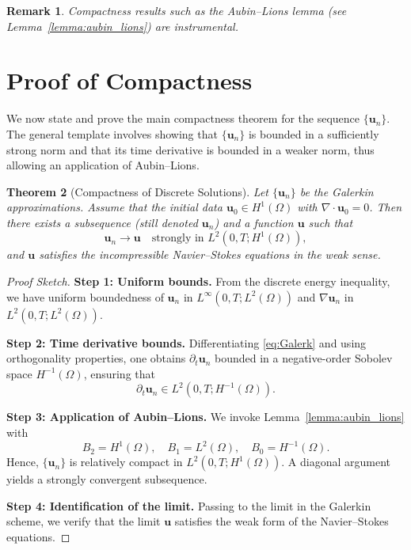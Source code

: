 \documentclass[11pt]{article}
\newtheorem{theorem}{Theorem}[section]
\newtheorem{remark}[theorem]{Remark}
\numberwithin{equation}{section}
\begin{document}
\begin{remark}
Compactness results such as the Aubin--Lions lemma
(see Lemma~\ref{lemma:aubin_lions}) are instrumental.
\end{remark}

\section{Proof of Compactness}\label{sec:compactness}

We now state and prove the main compactness theorem for the sequence
\(\{\mathbf{u}_n\}\). The general template involves showing that
\(\{\mathbf{u}_n\}\) is bounded in a sufficiently strong norm and that
its time derivative is bounded in a weaker norm, thus allowing an application
of Aubin--Lions.

\begin{theorem}[Compactness of Discrete Solutions]
\label{thm:compactness}
Let \(\{\mathbf{u}_n\}\) be the Galerkin approximations. Assume that
the initial data \(\mathbf{u}_0\in H^1(\Omega)\) with \(\nabla\cdot\mathbf{u}_0=0\).
Then there exists a subsequence (still denoted \(\mathbf{u}_n\))
and a function \(\mathbf{u}\) such that
\[
\mathbf{u}_n \to \mathbf{u} \quad \text{strongly in } L^2(0,T;H^1(\Omega)),
\]
and \(\mathbf{u}\) satisfies the incompressible Navier--Stokes equations
in the weak sense.
\end{theorem}

\begin{proof}[Proof Sketch]
\textbf{Step 1: Uniform bounds.}
From the discrete energy inequality, we have uniform boundedness of
\(\mathbf{u}_n\) in \(L^\infty(0,T;L^2(\Omega))\) and
\(\nabla \mathbf{u}_n\) in \(L^2(0,T;L^2(\Omega))\).

\noindent
\textbf{Step 2: Time derivative bounds.}
Differentiating \eqref{eq:Galerk} and using orthogonality properties,
one obtains \(\partial_t \mathbf{u}_n\) bounded in a negative-order Sobolev space
\(H^{-1}(\Omega)\), ensuring that
\[
\partial_t \mathbf{u}_n \in L^2(0,T;H^{-1}(\Omega)).
\]

\noindent
\textbf{Step 3: Application of Aubin--Lions.}
We invoke Lemma~\ref{lemma:aubin_lions} with
\[
B_2 = H^1(\Omega),\quad B_1 = L^2(\Omega), \quad B_0 = H^{-1}(\Omega).
\]
Hence, \(\{\mathbf{u}_n\}\) is relatively compact in \(L^2(0,T;H^1(\Omega))\).
A diagonal argument yields a strongly convergent subsequence.

\noindent
\textbf{Step 4: Identification of the limit.}
Passing to the limit in the Galerkin scheme, we verify that the limit \(\mathbf{u}\)
satisfies the weak form of the Navier--Stokes equations.
\end{proof}
\end{document}
